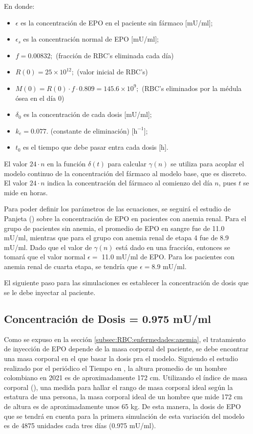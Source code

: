En donde:
\begin{itemize}
    \item $\epsilon$ es la concentración de EPO en el paciente sin fármaco [mU/ml];
    \item $\epsilon_s$ es la concentración normal de EPO [mU/ml];
    \item $f=0.00832;$ (fracción de RBC's eliminada cada día)
    \item $R(0) = 25\times 10^{12};$ (valor inicial de RBC's)
    \item $M(0) = R(0)\cdot f \cdot 0.809 = 145.6\times 10^{9};$ (RBC's eliminados por la médula ósea en el día 0)
    \item $\delta_0$ es la concentración de cada dosis [mU/ml];
    \item $k_e=0.077.$ (constante de eliminación) [$\textrm{h}^{-1}$];
    \item $t_0$ es el tiempo que debe pasar entra cada dosis [h].
\end{itemize}

El valor $24\cdot n$ en la función $\delta(t)$ para calcular $\gamma(n)$ se utiliza para acoplar el modelo continuo de la concentración del fármaco al modelo base, que es discreto. El valor $24 \cdot n$ indica la concentración del fármaco al comienzo del día $n$, pues $t$ se mide en horas.

Para poder definir los parámetros de las ecuaciones, se seguirá el estudio de Panjeta (\cite{panjeta2017interpretation}) sobre la concentración de EPO en pacientes con anemia renal. Para el grupo de pacientes sin anemia, el promedio de EPO en sangre fue de 11.0 mU/ml, mientras que para el grupo con anemia renal de etapa 4 fue de 8.9 mU/ml. Dado que el valor de $\gamma(n)$ está dado en una fracción, entonces se tomará que el valor normal $\epsilon =$ 11.0 mU/ml de EPO. Para los pacientes con anemia renal de cuarta etapa, se tendría que $\epsilon = 8.9$ mU/ml.

El siguiente paso para las simulaciones es establecer la concentración de dosis que se le debe inyectar al paciente.

\subsection{Concentración de Dosis  = 0.975 mU/ml}

Como se expuso en la sección \ref{subsec:RBC:enfermedades:anemia}, el tratamiento de inyección de EPO depende de la masa corporal del paciente, se debe encontrar una masa corporal en el que basar la dosis pra el modelo. Siguiendo el estudio realizado por el periódico el Tiempo en \cite{elTiempo}, la altura promedio de un hombre colombiano en 2021 es de aproximadamente 172 cm. Utilizando el índice de masa corporal (\cite{IMC}), una medida para hallar el rango de masa corporal ideal según la estatura de una persona, la masa corporal ideal de un hombre que mide 172 cm de altura es de aproximadamente unos 65 kg. De esta manera, la dosis de EPO que se tendrá en cuenta para la primera simulación de esta variación del modelo es de 4875 unidades cada tres días (0.975 mU/ml).

